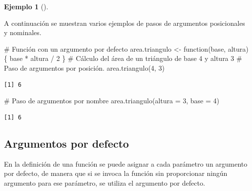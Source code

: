 \documentclass[
  a4paper,
]{scrreport}
\newenvironment{Shaded}{\begin{snugshade}}{\end{snugshade}}
\newcommand{\AttributeTok}[1]{\textcolor[rgb]{0.40,0.45,0.13}{#1}}
\newcommand{\CommentTok}[1]{\textcolor[rgb]{0.37,0.37,0.37}{#1}}
\newcommand{\ControlFlowTok}[1]{\textcolor[rgb]{0.00,0.23,0.31}{#1}}
\newcommand{\DecValTok}[1]{\textcolor[rgb]{0.68,0.00,0.00}{#1}}
\newcommand{\FunctionTok}[1]{\textcolor[rgb]{0.28,0.35,0.67}{#1}}
\newcommand{\NormalTok}[1]{\textcolor[rgb]{0.00,0.23,0.31}{#1}}
\newcommand{\OtherTok}[1]{\textcolor[rgb]{0.00,0.23,0.31}{#1}}
\newcommand{\SpecialCharTok}[1]{\textcolor[rgb]{0.37,0.37,0.37}{#1}}
\theoremstyle{definition}
\theoremstyle{definition}
\newtheorem{example}{Ejemplo}[chapter]
\theoremstyle{remark}
\begin{document}
\leavevmode{}%
\begin{example}[]\label{exm-paso-parametros-funcion}

A continuación se muestran varios ejemplos de pasos de argumentos
posicionales y nominales.

\begin{Shaded}
\begin{Highlighting}[]
\CommentTok{\# Función con un argumento por defecto}
\NormalTok{area.triangulo }\OtherTok{\textless{}{-}} \ControlFlowTok{function}\NormalTok{(base, altura) \{}
\NormalTok{  base }\SpecialCharTok{*}\NormalTok{ altura }\SpecialCharTok{/} \DecValTok{2}
\NormalTok{\}}
\CommentTok{\# Cálculo del área de un triángulo de base 4 y altura 3}
\CommentTok{\# Paso de argumentos por posición. }
\FunctionTok{area.triangulo}\NormalTok{(}\DecValTok{4}\NormalTok{, }\DecValTok{3}\NormalTok{)}
\end{Highlighting}
\end{Shaded}

\begin{verbatim}
[1] 6
\end{verbatim}

\begin{Shaded}
\begin{Highlighting}[]
\CommentTok{\# Paso de argumentos por nombre}
\FunctionTok{area.triangulo}\NormalTok{(}\AttributeTok{altura =} \DecValTok{3}\NormalTok{, }\AttributeTok{base =} \DecValTok{4}\NormalTok{)}
\end{Highlighting}
\end{Shaded}

\begin{verbatim}
[1] 6
\end{verbatim}

\end{example}

\hypertarget{argumentos-por-defecto}{%
\subsection{Argumentos por defecto}\label{argumentos-por-defecto}}

En la definición de una función se puede asignar a cada parámetro un
argumento por defecto, de manera que si se invoca la función sin
proporcionar ningún argumento para ese parámetro, se utiliza el
argumento por defecto.
\end{document}
